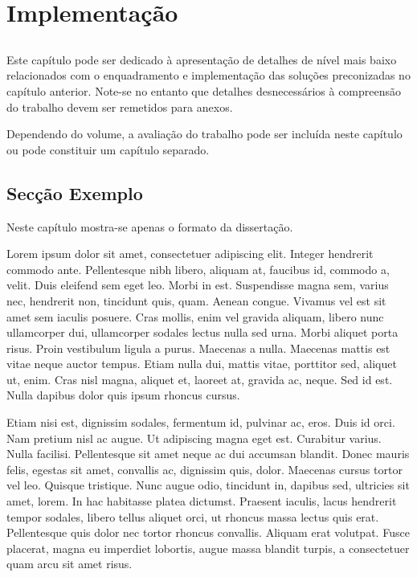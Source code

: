 \chapter{Implementação}\label{chap:chap4}

\section*{}

Este capítulo pode ser dedicado à apresentação de detalhes de nível
mais baixo relacionados com o enquadramento e implementação das
soluções preconizadas no capítulo anterior.
Note-se no entanto que detalhes desnecessários à compreensão do
trabalho devem ser remetidos para anexos.

Dependendo do volume, a avaliação do trabalho pode ser incluída neste
capítulo ou pode constituir um capítulo separado.

\section{Secção Exemplo}

Neste capítulo mostra-se apenas o formato da dissertação.

Lorem ipsum dolor sit amet, consectetuer adipiscing elit. Integer
hendrerit commodo ante. Pellentesque nibh libero, aliquam at, faucibus
id, commodo a, velit. Duis eleifend sem eget leo. Morbi in
est. Suspendisse magna sem, varius nec, hendrerit non, tincidunt quis,
quam. Aenean congue. Vivamus vel est sit amet sem iaculis
posuere. Cras mollis, enim vel gravida aliquam, libero nunc
ullamcorper dui, ullamcorper sodales lectus nulla sed urna. Morbi
aliquet porta risus. Proin vestibulum ligula a purus. Maecenas a
nulla. Maecenas mattis est vitae neque auctor tempus. Etiam nulla dui,
mattis vitae, porttitor sed, aliquet ut, enim. Cras nisl magna,
aliquet et, laoreet at, gravida ac, neque. Sed id est. Nulla dapibus
dolor quis ipsum rhoncus cursus. 

Etiam nisi est, dignissim sodales, fermentum id, pulvinar ac,
eros. Duis id orci. Nam pretium nisl ac augue. Ut adipiscing magna
eget est. Curabitur varius. Nulla facilisi. Pellentesque sit amet
neque ac dui accumsan blandit. Donec mauris felis, egestas sit amet,
convallis ac, dignissim quis, dolor. Maecenas cursus tortor vel
leo. Quisque tristique. Nunc augue odio, tincidunt in, dapibus sed,
ultricies sit amet, lorem. In hac habitasse platea dictumst. Praesent
iaculis, lacus hendrerit tempor sodales, libero tellus aliquet orci,
ut rhoncus massa lectus quis erat. Pellentesque quis dolor nec tortor
rhoncus convallis. Aliquam erat volutpat. Fusce placerat, magna eu
imperdiet lobortis, augue massa blandit turpis, a consectetuer quam
arcu sit amet risus. 

